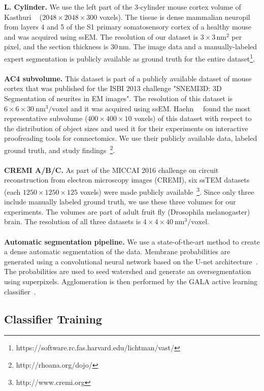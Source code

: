 \textbf{L. Cylinder.} We use the left part of the 3-cylinder mouse cortex volume of Kasthuri \etal~\cite{kasthuri2015saturated} ($2048\times2048\times300$ voxels). The tissue is dense mammalian neuropil from layers 4 and 5 of the S1 primary somatosensory cortex of a healthy mouse and was acquired using ssEM. The resolution of our dataset is $3\times3\, \text{nm}^2$ per pixel, and the section thickness is $30\, \text{nm}$. The image data and a manually-labeled expert segmentation is publicly available as ground truth for the entire dataset\footnote{https://software.rc.fas.harvard.edu/lichtman/vast/}.
\\~\\
\textbf{AC4 subvolume.} This dataset is part of a publicly available dataset of mouse cortex that was published for the ISBI 2013 challenge "SNEMI3D: 3D Segmentation of neurites in EM images". The resolution of this dataset is $6\times6\times30~\text{nm}^3\text{/voxel}$ and it was acquired using ssEM. Haehn~\etal~\cite{haehn_dojo_2014} found the most representative subvolume ($400\times400\times10$ voxels) of this dataset with respect to the distribution of object sizes and used it for their experiments on interactive proofreading tools for connectomics. We use their publicly available data, labeled ground truth, and study findings~\footnote{http://rhoana.org/dojo/}.
\\~\\
\textbf{CREMI A/B/C.} As part of the MICCAI 2016 challenge on circuit reconstruction from electron microscopy images (CREMI), six ssTEM datasets (each $1250\times1250\times125$ voxels) were made publicly available~\footnote{http://www.cremi.org}. Since only three include manually labeled ground truth, we use these three volumes for our experiments. The volumes are part of adult fruit fly (Drosophila melanogaster) brain. The resolution of all three datasets is $4\times4\times40~\text{nm}^3\text{/voxel}$.
\\~\\
\textbf{Automatic segmentation pipeline.}
We use a state-of-the-art method to create a dense automatic segmentation of the data. Membrane probabilities are generated using a convolutional neural network based on the U-net architecture~\cite{RonnebergerFB15}. The probabilities are used to seed watershed and generate an oversegmentation using superpixels. Agglomeration is then performed by the GALA active learning classifier~\cite{nunez2014graph}.

\subsection{Classifier Training}

